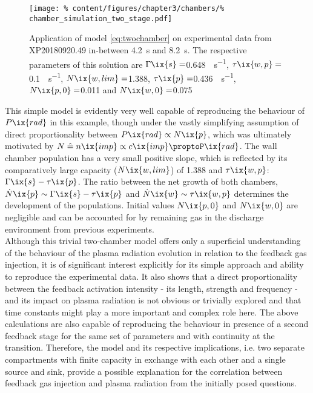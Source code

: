 %
        \begin{figure}[t]%
            \centering%
            \texttt{[image: \%
                content/figures/chapter3/chambers/\%
                chamber\_simulation\_two\_stage.pdf]}%
            \caption{Application of model \cref{eq:twochamber} on experimental data from XP20180920.49 in-between \SI{4.2}{\second} and \SI{8.2}{\second}. The respective parameters of this solution are $\Gamma\ix{s}=$\SI{0.648}{\arbitraryunit\per\second}, $\tau\ix{w,p}=$\SI{0.1}{\arbitraryunit\per\second}, $N\ix{w,lim}=$\SI{1.388}{\arbitraryunit}, $\tau\ix{p}=$\SI{0.436}{\arbitraryunit\per\second}, $N\ix{p,0}=$\SI{0.011}{\arbitraryunit} and $N\ix{w,0}=$\SI{0.075}{\arbitraryunit}}\label{fig:twochamber_twostage}%
        \end{figure}%
%
        This simple model is evidently very well capable of reproducing the behaviour of $P\ix{rad}$ in this example, though under the vastly simplifying assumption of direct proportionality between $P\ix{rad}\propto N\ix{p}$, which was ultimately motivated by $N\mathrel{\hat{=}}n\ix{imp}\propto c\ix{imp}\proptoP\ix{rad}$. The wall chamber population has a very small positive slope, which is reflected by its comparatively large capacity ($N\ix{w,lim}$) of 1.388 and $\tau\ix{w,p}$:$\Gamma\ix{s}-\tau\ix{p}$. The ratio between the net growth of both chambers, $\dot{N}\ix{p}\sim\Gamma\ix{s}-\tau\ix{p}$ and $\dot{N}\ix{w}\sim\tau\ix{w,p}$ determines the development of the populations. Initial values $N\ix{p,0}$ and $N\ix{w,0}$ are negligible and can be accounted for by remaining gas in the discharge environment from previous experiments.\\%
        Although this trivial two-chamber model offers only a superficial understanding of the behaviour of the plasma radiation evolution in relation to the feedback gas injection, it is of significant interest explicitly for its simple approach and ability to reproduce the experimental data. It also shows that a direct proportionality between the feedback activation intensity - its length, strength and frequency - and its impact on plasma radiation is not obvious or trivially explored and that time constants might play a more important and complex role here. The above calculations are also capable of reproducing the behaviour in presence of a second feedback stage for the same set of parameters and with continuity at the transition. Therefore, the model and its respective implications, i.e. two separate compartments with finite capacity in exchange with each other and a single source and sink, provide a possible explanation for the correlation between feedback gas injection and plasma radiation from the initially posed questions.%
%
